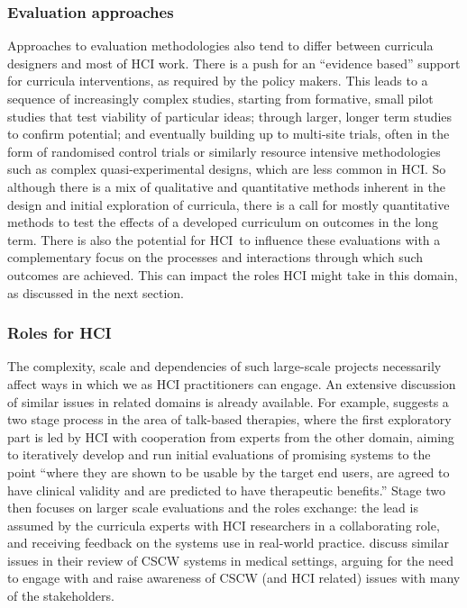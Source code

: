 \documentclass[prodmode,acmtochi]{acmsmall}
\begin{document}
\subsubsection{Evaluation approaches}
Approaches to evaluation methodologies also tend to differ between curricula designers and most of HCI work. There is a push for an ``evidence based'' support for curricula interventions, as required by the policy makers. This leads to a sequence of increasingly complex studies, starting from formative, small pilot studies that test viability of particular ideas; through larger, longer term studies to confirm potential; and eventually building up to multi-site trials, often in the form of randomised control trials or similarly resource intensive methodologies such as complex quasi-experimental designs, which are less common in HCI.  So although there is a mix of qualitative and quantitative methods inherent in the design and initial exploration of curricula, there is a call for mostly quantitative methods to test the effects of a developed curriculum on outcomes in the long term. There is also the potential for HCI\ to influence these evaluations with a complementary focus on the processes and interactions through which such outcomes are achieved. This can impact the roles HCI might take in this domain, as discussed in the next section. 



\subsubsection{Roles for HCI}
The complexity, scale and dependencies of such large-scale projects necessarily affect ways in which we as HCI practitioners can engage.  An extensive discussion of similar issues in related domains is already available. 
%
For example,  suggests a two stage process in the area of talk-based therapies, where the first exploratory part is led by HCI with cooperation from experts from the other domain, aiming to iteratively develop and run initial evaluations of promising systems to the point ``where they are shown to be usable by the target end users, are agreed to have clinical validity and are predicted to have therapeutic benefits.'' Stage two then focuses on larger scale evaluations and the roles exchange: the lead is assumed by the curricula experts with HCI researchers in a collaborating role, and receiving feedback on the systems use in real-world practice.
 discuss similar issues in their review of CSCW systems in medical settings, arguing for the need to engage with and raise awareness of CSCW (and HCI related) issues with many of the stakeholders. 
\end{document}
